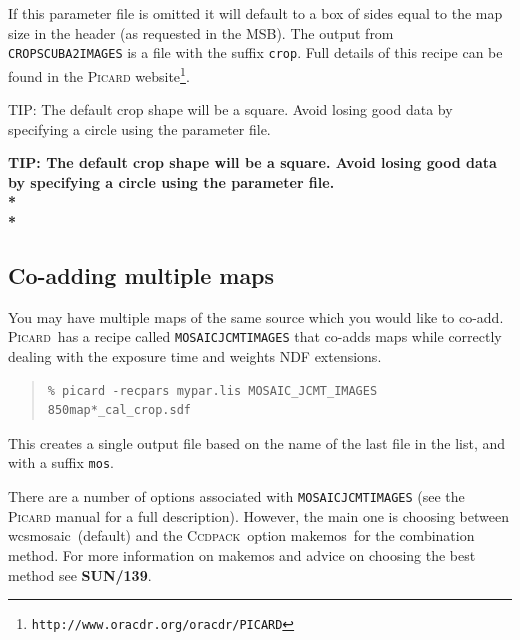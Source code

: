 \documentclass[twoside,11pt]{article}
\newcommand{\htmladdnormallink}[2]{#1}
\newenvironment{latexonly}{}{}
\newcommand{\latex}[1]{#1}
\newcommand{\xref}[3]{#1}
\newcommand{\xlabel}[1]{}
\renewcommand{\_}{\texttt{\symbol{95}}}
\newenvironment{fmpage}[1]{\begin{lrbox}{\fmbox}\begin{minipage}{#1}}{\end{minipage}\end{lrbox}\fbox{\usebox{\fmbox}}}
\newenvironment{myquote}{
   \color{MidnightBlue}\begin{quote}\begin{small}}{
   \end{small}\end{quote}
}
\newcommand{\ccdpack}{\xref{\textsc{Ccdpack}}{sun139}{}}
\newcommand{\picard}{\xref{\textsc{Picard}}{sun265}{}}
\newcommand{\drrecipe}[1]{\texttt{#1}}
\newcommand{\task}[1]{\textsf{#1}}
\newcommand{\file}[1]{\texttt{#1}}
\newcommand{\url}[1]{\texttt{#1}}
\newcommand{\wcsmosaic}{\xref{\task{wcsmosaic}}{sun95}{WCSMOSAIC}}
\newcommand{\makemos}{\xref{\task{makemos}}{sun139}{MAKEMOS}}
\renewenvironment{myquote}{
      \begin{quote}\begin{small}}{
      \end{small}\end{quote}
   }
\begin{document}
If this parameter file is omitted it will default to a box of sides
equal to the map size in the header (as requested in the MSB). The
output from \drrecipe{CROP\_SCUBA2\_IMAGES} is a file with the suffix
\file{\_crop}. Full details of this recipe can be found in the
\htmladdnormallink{\textsc{Picard}
website}{http://www.oracdr.org/oracdr/PICARD}\latex{\footnote{\url{http://www.oracdr.org/oracdr/PICARD}}}.

\begin{latexonly}
\begin{center}
\begin{fmpage}{0.95\linewidth}
\vspace{0.1cm}
TIP: The default crop shape will be a square. Avoid losing good data
by specifying a circle using the parameter file.
\end{fmpage}
\end{center}
\end{latexonly}

\begin{htmlonly}
\textbf{TIP: The default crop shape will be a square. Avoid losing
good data by specifying a circle using the parameter file.\\*\\*}
\end{htmlonly}


\subsection{\xlabel{coadd}Co-adding multiple maps}
\label{sec:coadd}

You may have multiple maps of the same source which you would like to
co-add. \picard\ has a recipe called
\xref{\drrecipe{MOSAIC\_JCMT\_IMAGES}}{sun265}{MOSAIC_JCMT_IMAGES}
that co-adds maps while correctly dealing with the exposure time and
weights NDF extensions.
\begin{myquote}
\begin{verbatim}
% picard -recpars mypar.lis MOSAIC_JCMT_IMAGES 850map*_cal_crop.sdf
\end{verbatim}
\end{myquote}
This creates a single output file based on the name of the last file
in the list, and with a suffix \file{\_mos}.

There are a number of options associated with
\drrecipe{MOSAIC\_JCMT\_IMAGES} (see the \textsc{Picard} manual for a full
description). However, the main one is choosing between \wcsmosaic\
(default) and the \ccdpack\ option \makemos\ for the combination
method. For more information on \task{makemos} and advice on choosing the
best method see \xref{\textbf{SUN/139}}{sun139}{}.
\end{document}
